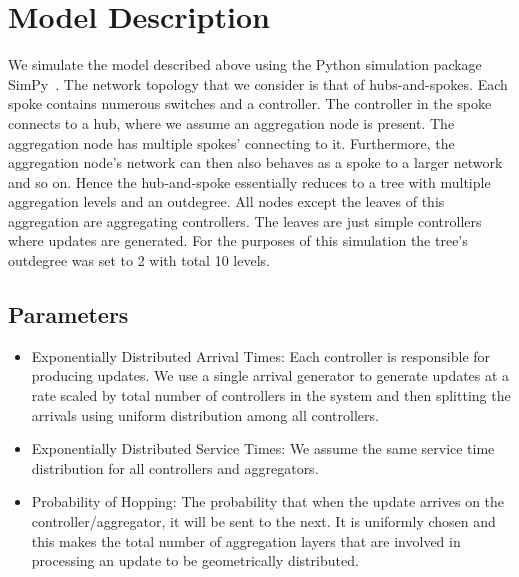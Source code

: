 \documentclass[conference]{IEEEtran}
\begin{document}


\section{Model Description}
We simulate the model described above using the Python simulation package SimPy~\cite{simpy}. The network topology that we consider is that of hubs-and-spokes. Each spoke contains numerous switches and a controller. The controller in the spoke connects to a hub, where we assume an aggregation node is present. The aggregation node has multiple spokes' connecting to it. Furthermore, the aggregation node's network can then also behaves as a spoke to a larger network and so on. Hence the hub-and-spoke essentially reduces to a tree with multiple aggregation levels and an outdegree. All nodes except the leaves of this aggregation are aggregating controllers. The leaves are just simple controllers where updates are generated. For the purposes of this simulation the tree's outdegree was set to 2 with total 10 levels.

\subsection{Parameters}
\begin{itemize}
 \item Exponentially Distributed Arrival Times: Each controller is responsible for producing updates. We use a single arrival generator to generate updates at a rate scaled by total number of controllers in the system and then splitting the arrivals using uniform distribution among all controllers.
 \item Exponentially Distributed Service Times: We assume the same service time distribution for all controllers and aggregators. 
 \item Probability of Hopping: The probability that when the update arrives on the controller/aggregator, it will be sent to the next. It is uniformly chosen and this makes the total number of aggregation layers that are involved in processing an update to be geometrically distributed.
 
 \end{itemize}
\end{document}
